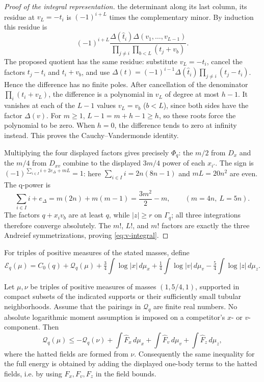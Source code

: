 \begin{proof}[Proof of the integral representation]
the determinant along its last column, its residue at $v_L=-t_i$ is
$(-1)^{i+L}$ times the complementary minor.  By induction this residue is
\[
 (-1)^{i+L}
 \frac{\Delta(\widehat t_i)\Delta(v_1,\ldots,v_{L-1})}
      {\prod_{j\ne i}\prod_{b<L}(t_j+v_b)}.
\]
The proposed quotient has the same residue: substitute $v_L=-t_i$,
cancel the factors $t_j-t_i$ and $t_i+v_b$, and use
$\Delta(t)=(-1)^{i-1}\Delta(\widehat t_i)
\prod_{j\ne i}(t_j-t_i)$.  Hence the difference has no finite poles.
After cancellation of the denominator $\prod_i(t_i+v_L)$, the difference
is a polynomial in $v_L$ of degree at most $h-1$.  It vanishes at each of
the $L-1$ values $v_L=v_b$ ($b<L$), since both sides have the factor
$\Delta(v)$.  For $m\ge1$, $L-1=m+h-1\ge h$, so these roots force the
polynomial to be zero.  When $h=0$, the difference tends to zero at
infinity instead.  This proves the Cauchy--Vandermonde identity.

Multiplying the four displayed factors gives precisely $\Phi_q$: the
$m/2$ from $D_x$ and the $m/4$ from $D_{xv}$ combine to the displayed
$3m/4$ power of each $x_{i'}$.  The sign is
$(-1)^{\sum_{i\in I}i+2e_\Delta+mL}=1$: here
$\sum_{i\in I}i=2n(8n-1)$ and $mL=20n^2$ are even.  The q-power is
\[
 \sum_{i\in I}i+e_\Delta
 =m(2n)+m(m-1)
 =\frac{3m^2}{2}-m,
 \qquad (m=4n,\ L=5n).
\]
The factors $q+x_iv_b$ are at least
$q$, while $|z|\ge r$ on $\Gamma_q$; all three integrations therefore
converge absolutely.  The $m!$, $L!$, and $m!$ factors are exactly the three
Andreief symmetrizations, proving \eqref{eq:v-integral}.
\end{proof}
For triples of positive measures of the stated masses, define
\begin{equation}\label{eq:v-full-energy}
 \mathcal E_q(\mu)=C_0(q)+\mathcal Q_q(\mu)
 +\tfrac34\int\log|x|\,d\mu_x
 +\tfrac14\int\log|v|\,d\mu_v
 -\tfrac54\int\log|z|\,d\mu_z.
\end{equation}

\begin{lemma}
\label{lem:v-concavity}
Let $\mu,\nu$ be triples of positive measures of masses
$(1,5/4,1)$, supported in compact subsets of the indicated supports or
their sufficiently small tubular neighborhoods.  Assume that the pairings
in $\mathcal Q_q$ are finite real numbers.  No absolute logarithmic moment
assumption is imposed on a competitor's $x$- or $v$-component.  Then
\[
 \mathcal Q_q(\mu)\le-\mathcal Q_q(\nu)
       +\int \widehat F_x\,d\mu_x+\int \widehat F_v\,d\mu_v
       +\int \widehat F_z\,d\mu_z,
\]
where the hatted fields are formed from $\nu$.  Consequently the same
inequality for the full energy is obtained by adding the displayed one-body
terms to the hatted fields, i.e. by using $F_x,F_v,F_z$ in the field bounds.
\end{lemma}

